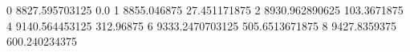 0 8827.595703125 0.0
1 8855.046875 27.451171875
2 8930.962890625 103.3671875
4 9140.564453125 312.96875
6 9333.2470703125 505.6513671875
8 9427.8359375 600.240234375
